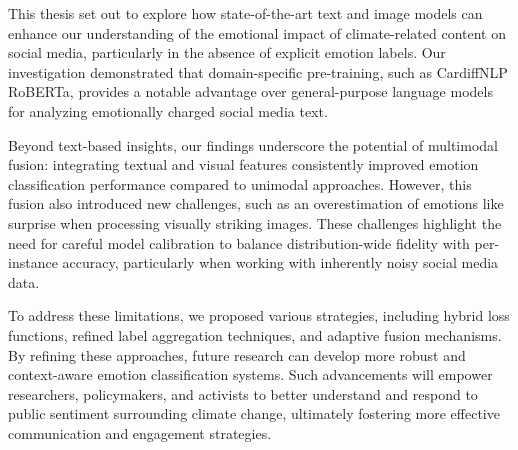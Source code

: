 This thesis set out to explore how state-of-the-art text and image models can enhance our understanding of the emotional impact of climate-related content on social media, particularly in the absence of explicit emotion labels. Our investigation demonstrated that domain-specific pre-training, such as CardiffNLP RoBERTa, provides a notable advantage over general-purpose language models for analyzing emotionally charged social media text.
\newline

Beyond text-based insights, our findings underscore the potential of multimodal fusion: integrating textual and visual features consistently improved emotion classification performance compared to unimodal approaches. However, this fusion also introduced new challenges, such as an overestimation of emotions like surprise when processing visually striking images. These challenges highlight the need for careful model calibration to balance distribution-wide fidelity with per-instance accuracy, particularly when working with inherently noisy social media data.
\newline

To address these limitations, we proposed various strategies, including hybrid loss functions, refined label aggregation techniques, and adaptive fusion mechanisms. By refining these approaches, future research can develop more robust and context-aware emotion classification systems. Such advancements will empower researchers, policymakers, and activists to better understand and respond to public sentiment surrounding climate change, ultimately fostering more effective communication and engagement strategies.